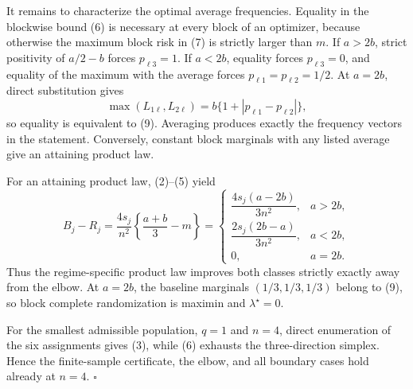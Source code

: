 It remains to characterize the optimal average frequencies.  Equality in the blockwise bound (6) is necessary at every block of an optimizer, because otherwise the maximum block risk in (7) is strictly larger than \(m\).  If \(a>2b\), strict positivity of \(a/2-b\) forces \(p_{\ell3}=1\).  If \(a<2b\), equality forces \(p_{\ell3}=0\), and equality of the maximum with the average forces \(p_{\ell1}=p_{\ell2}=1/2\).  At \(a=2b\), direct substitution gives
\[
\max(L_{1\ell},L_{2\ell})
=b\{1+|p_{\ell1}-p_{\ell2}|\},
\tag{10}
\]
so equality is equivalent to (9).  Averaging produces exactly the frequency vectors in the statement.  Conversely, constant block marginals with any listed average give an attaining product law.

For an attaining product law, (2)--(5) yield
\[
B_j-R_j
=\frac{4s_j}{n^2}\left\{\frac{a+b}{3}-m\right\}
=
\begin{cases}
\dfrac{4s_j(a-2b)}{3n^2},&a>2b,\\[6pt]
\dfrac{2s_j(2b-a)}{3n^2},&a<2b,\\[6pt]
0,&a=2b.
\end{cases}
\tag{11}
\]
Thus the regime-specific product law improves both classes strictly exactly away from the elbow.  At \(a=2b\), the baseline marginals \((1/3,1/3,1/3)\) belong to (9), so block complete randomization is maximin and \(\lambda^\star=0\).

For the smallest admissible population, \(q=1\) and \(n=4\), direct enumeration of the six assignments gives (3), while (6) exhausts the three-direction simplex.  Hence the finite-sample certificate, the elbow, and all boundary cases hold already at \(n=4\).  \(\square\)